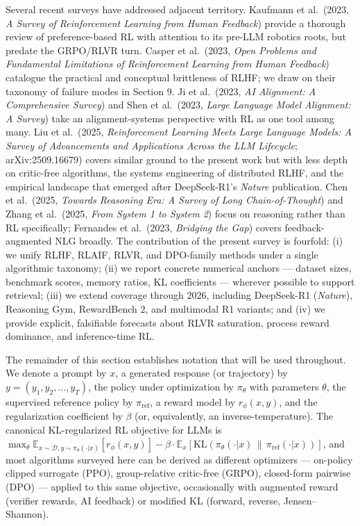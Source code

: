 \documentclass{article}
\begin{document}
Several recent surveys have addressed adjacent territory. Kaufmann et al.~(2023, \emph{A Survey of Reinforcement Learning from Human Feedback}) provide a thorough review of preference-based RL with attention to its pre-LLM robotics roots, but predate the GRPO/RLVR turn. Casper et al.~(2023, \emph{Open Problems and Fundamental Limitations of Reinforcement Learning from Human Feedback}) catalogue the practical and conceptual brittleness of RLHF; we draw on their taxonomy of failure modes in Section 9. Ji et al.~(2023, \emph{AI Alignment: A Comprehensive Survey}) and Shen et al.~(2023, \emph{Large Language Model Alignment: A Survey}) take an alignment-systems perspective with RL as one tool among many. Liu et al.~(2025, \emph{Reinforcement Learning Meets Large Language Models: A Survey of Advancements and Applications Across the LLM Lifecycle}; arXiv:2509.16679) covers similar ground to the present work but with less depth on critic-free algorithms, the systems engineering of distributed RLHF, and the empirical landscape that emerged after DeepSeek-R1's \emph{Nature} publication. Chen et al.~(2025, \emph{Towards Reasoning Era: A Survey of Long Chain-of-Thought}) and Zhang et al.~(2025, \emph{From System 1 to System 2}) focus on reasoning rather than RL specifically; Fernandes et al.~(2023, \emph{Bridging the Gap}) covers feedback-augmented NLG broadly. The contribution of the present survey is fourfold: (i) we unify RLHF, RLAIF, RLVR, and DPO-family methods under a single algorithmic taxonomy; (ii) we report concrete numerical anchors --- dataset sizes, benchmark scores, memory ratios, KL coefficients --- wherever possible to support retrieval; (iii) we extend coverage through 2026, including DeepSeek-R1 (\emph{Nature}), Reasoning Gym, RewardBench 2, and multimodal R1 variants; and (iv) we provide explicit, falsifiable forecasts about RLVR saturation, process reward dominance, and inference-time RL.

The remainder of this section establishes notation that will be used throughout. We denote a prompt by \(x\), a generated response (or trajectory) by \(y = (y_1, y_2, \ldots, y_T)\), the policy under optimization by \(\pi_\theta\) with parameters \(\theta\), the supervised reference policy by \(\pi_{\text{ref}}\), a reward model by \(r_\phi(x, y)\), and the regularization coefficient by \(\beta\) (or, equivalently, an inverse-temperature). The canonical KL-regularized RL objective for LLMs is \(\max_\theta \mathbb{E}_{x \sim \mathcal{D}, y \sim \pi_\theta(\cdot|x)} [r_\phi(x, y)] - \beta \cdot \mathbb{E}_{x} [\mathrm{KL}(\pi_\theta(\cdot|x) \,\|\, \pi_{\text{ref}}(\cdot|x))]\), and most algorithms surveyed here can be derived as different optimizers --- on-policy clipped surrogate (PPO), group-relative critic-free (GRPO), closed-form pairwise (DPO) --- applied to this same objective, occasionally with augmented reward (verifier rewards, AI feedback) or modified KL (forward, reverse, Jensen--Shannon).
\end{document}
